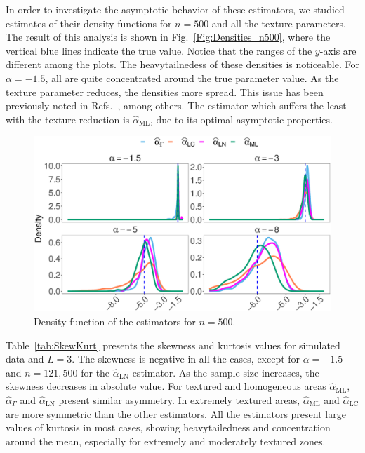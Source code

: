 \documentclass[twocolumn]{svjour3}
\begin{document}
In order to investigate the asymptotic behavior of these estimators, we studied estimates of their density functions for $n=500$ and all the texture parameters. 
The result of this analysis is shown in Fig.~\ref{Fig:Densities_n500}, where
the vertical blue lines indicate the true value. 
Notice that the ranges of the $y$-axis are different among the plots. 
The heavytailnedess of these densities is noticeable.
For $\alpha=-1.5$, all are quite concentrated around the true parameter value. 
As the texture parameter reduces, the densities more spread.
This issue has been previously noted in Refs.~\cite{APSAR2013ParameterEstimationStochasticDistances,CribariFrerySilva:CSDA,AllendeFreryetal:JSCS:05,FreryCribariSouza:JASP:04}, among others.
The estimator which suffers the least with the texture reduction is $\widehat{\alpha}_{\text{{ML}}}$, due to its optimal asymptotic properties.      

\begin{figure}[hbt]
	\centering
	\includegraphics[width=1\linewidth]{../../../Figures/PaperTesis/Asymptotic_n500_TodoAlfa}
	\caption{\label{Fig:Densities_n500} Density function of the estimators for $n=500$. }\label{Fig:DistEstimator}
\end{figure}

Table~\ref{tab:SkewKurt} presents the skewness and kurtosis values for simulated data and $L=3$. 
The skewness is negative in all the cases, except for $\alpha=-1.5$ and $n=121,500$ for the $\widehat{\alpha}_{\text{{LN}}}$ estimator. 
As the sample size increases, the skewness decreases in absolute value. 
For textured and homogeneous areas $\widehat{\alpha}_{\text{{ML}}}$, $\widehat{\alpha}_{\Gamma}$ and $\widehat{\alpha}_{\text{{LN}}}$ present similar asymmetry. 
In extremely textured areas, $\widehat{\alpha}_{\text{{ML}}}$ and $\widehat{\alpha}_{\text{{LC}}}$ are more symmetric than the other estimators.
All the estimators present large values of kurtosis in most cases, showing heavytailedness and concentration around the mean, especially for extremely and moderately textured zones.
\end{document}
